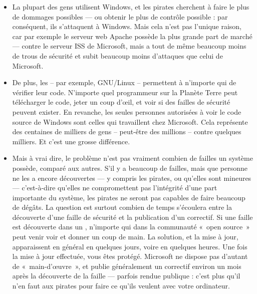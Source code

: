\begin{itemize}
\item La plupart des gens utilisent Windows, et les pirates cherchent à faire le plus de dommages possibles --- ou obtenir le plus de contrôle possible : par conséquent, ils s'attaquent à Windows. Mais cela n'est pas l'unique raison, car par exemple le serveur web Apache possède la plus grande part de marché --- contre le serveur ISS de Microsoft, mais a tout de même beaucoup moins de trous de sécurité et subit beaucoup moins d'attaques que celui de Microsoft. 
\item De plus, les  -- par exemple, GNU/Linux -- permettent à n'importe qui de vérifier leur code. N'importe quel programmeur sur la Planète Terre peut télécharger le code, jeter un coup d'œil, et voir si des failles de sécurité peuvent exister. En revanche, les seules personnes autorisées à voir le code source de Windows sont celles qui travaillent chez Microsoft. Cela représente des centaines de milliers de gens -- peut-être des millions -- contre quelques milliers. Et c'est une grosse différence. 
\item Mais à vrai dire, le problème n'est pas vraiment combien de failles un système possède, comparé aux autres. S'il y a beaucoup de failles, mais que personne ne les a encore découvertes --- y compris les pirates, ou qu'elles sont mineures --- c'est-à-dire qu'elles ne compromettent pas l'intégrité d'une part importante du système, les pirates ne seront pas capables de faire beaucoup de dégâts. La question est surtout combien de temps s'écoulera entre la découverte d'une faille de sécurité et la publication d'un correctif. Si une faille est découverte dans un , n'importe qui dans la communauté «~open source~» peut venir voir et donner un coup de main. La solution, et la mise à jour, apparaissent en général en quelques jours, voire en quelques heures. Une fois la mise à jour effectuée, vous êtes protégé. Microsoft ne dispose pas d'autant de «~main-d'œuvre~», et publie généralement un correctif environ un mois après la découverte de la faille --- parfois rendue publique : c'est plus qu'il n'en faut aux pirates pour faire ce qu'ils veulent avec votre ordinateur.

\end{itemize}
